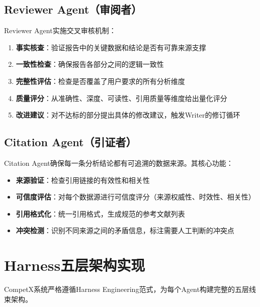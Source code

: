 \documentclass[12pt,a4paper]{ctexrep}
\begin{document}
\subsection{Reviewer Agent（审阅者）}

Reviewer Agent实施交叉审核机制：

\begin{enumerate}[leftmargin=2em]
\item \textbf{事实核查}：验证报告中的关键数据和结论是否有可靠来源支撑
\item \textbf{一致性检查}：确保报告各部分之间的逻辑一致性
\item \textbf{完整性评估}：检查是否覆盖了用户要求的所有分析维度
\item \textbf{质量评分}：从准确性、深度、可读性、引用质量等维度给出量化评分
\item \textbf{改进建议}：对不达标的部分提出具体的修改建议，触发Writer的修订循环
\end{enumerate}

\subsection{Citation Agent（引证者）}

Citation Agent确保每一条分析结论都有可追溯的数据来源。其核心功能：

\begin{itemize}[leftmargin=2em]
\item \textbf{来源验证}：检查引用链接的有效性和相关性
\item \textbf{可信度评估}：对每个数据源进行可信度评分（来源权威性、时效性、相关性）
\item \textbf{引用格式化}：统一引用格式，生成规范的参考文献列表
\item \textbf{冲突检测}：识别不同来源之间的矛盾信息，标注需要人工判断的冲突点
\end{itemize}

\section{Harness五层架构实现}

CompetX系统严格遵循Harness Engineering范式，为每个Agent构建完整的五层线束架构。
\end{document}
